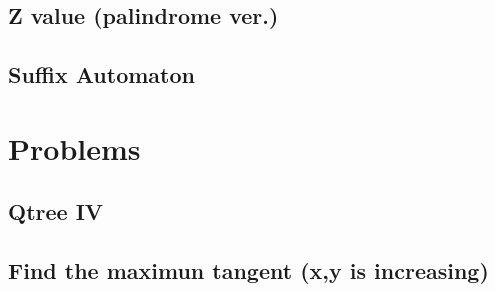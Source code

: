\documentclass[10pt,twocolumn,oneside]{article}
\begin{document}
\subsection{Z value (palindrome ver.)}


\subsection{Suffix Automaton}


\section{Problems}
\subsection {Qtree IV}


\subsection{Find the maximun tangent (x,y is increasing)}

\end{document}
